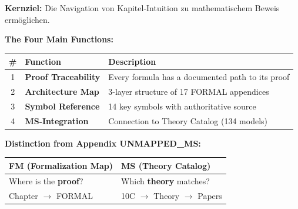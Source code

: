 \begin{tcolorbox}[colback=blue!5!white, colframe=blue!75!black,
    title=\textbf{Core Objective: Navigation from Intuition to Proof}]

\textbf{Kernziel:} Die Navigation von Kapitel-Intuition zu mathematischem Beweis ermöglichen.

\begin{center}
\end{center}

\vspace{0.5em}
\textbf{The Four Main Functions:}

\begin{center}
\begin{tabular}{|c|l|l|}
\hline
\textbf{\#} & \textbf{Function} & \textbf{Description} \\
\hline
\hline
1 & \textbf{Proof Traceability} & Every formula has a documented path to its proof \\
2 & \textbf{Architecture Map} & 3-layer structure of 17 FORMAL appendices \\
3 & \textbf{Symbol Reference} & 14 key symbols with authoritative source \\
4 & \textbf{MS-Integration} & Connection to Theory Catalog (134 models) \\
\hline
\end{tabular}
\end{center}

\vspace{0.5em}
\textbf{Distinction from Appendix UNMAPPED_MS:}

\begin{center}
\begin{tabular}{|l|l|}
\hline
\textbf{FM (Formalization Map)} & \textbf{MS (Theory Catalog)} \\
\hline
\hline
Where is the \textbf{proof}? & Which \textbf{theory} matches? \\
Chapter $\rightarrow$ FORMAL & 10C $\rightarrow$ Theory $\rightarrow$ Papers \\
\hline
\end{tabular}
\end{center}

\end{tcolorbox}

